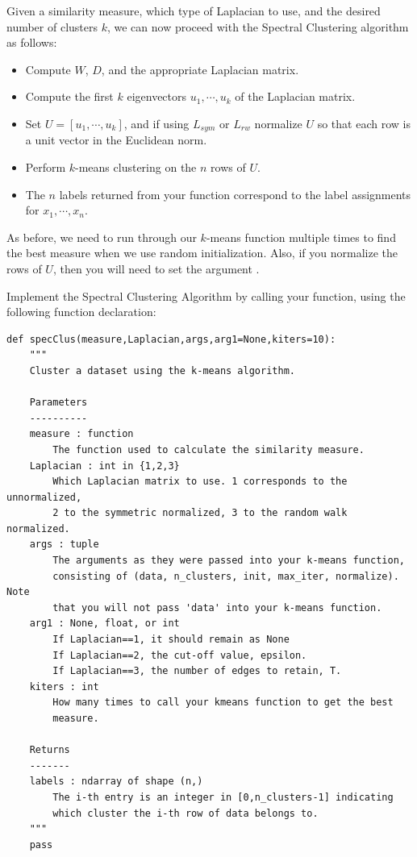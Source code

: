 Given a similarity measure, which type of Laplacian to use, and the desired number of clusters $k$, we can now proceed with the Spectral Clustering algorithm as follows:

\begin{itemize}
    \item Compute $W$, $D$, and the appropriate Laplacian matrix.
    \item Compute the first $k$ eigenvectors $u_1, \cdots , u_k$ of the Laplacian matrix.
    \item Set $U = [u_1, \cdots , u_k]$, and if using $L_{sym}$ or $L_{rw}$ normalize $U$ so that each row is a unit vector in the Euclidean norm.
    \item Perform $k$-means clustering on the $n$ rows of $U$.
    \item The $n$ labels returned from your  function correspond to the label assignments for $x_1, \cdots, x_n$.
\end{itemize}

As before, we need to run through our $k$-means function multiple times to find the best measure when we use random initialization.  Also, if you normalize the rows of $U$, then you will need to set the argument .

\begin{problem}
Implement the Spectral Clustering Algorithm by calling your  function, using the following function declaration:
\begin{lstlisting}
def specClus(measure,Laplacian,args,arg1=None,kiters=10):
    """
    Cluster a dataset using the k-means algorithm.

    Parameters
    ----------
    measure : function
        The function used to calculate the similarity measure.
    Laplacian : int in {1,2,3}
        Which Laplacian matrix to use. 1 corresponds to the unnormalized,
        2 to the symmetric normalized, 3 to the random walk normalized.
    args : tuple
        The arguments as they were passed into your k-means function,
        consisting of (data, n_clusters, init, max_iter, normalize). Note
        that you will not pass 'data' into your k-means function.
    arg1 : None, float, or int
        If Laplacian==1, it should remain as None
        If Laplacian==2, the cut-off value, epsilon.
        If Laplacian==3, the number of edges to retain, T.
    kiters : int
        How many times to call your kmeans function to get the best
        measure.

    Returns
    -------
    labels : ndarray of shape (n,)
        The i-th entry is an integer in [0,n_clusters-1] indicating
        which cluster the i-th row of data belongs to.
    """
    pass
\end{lstlisting}
\end{problem}

